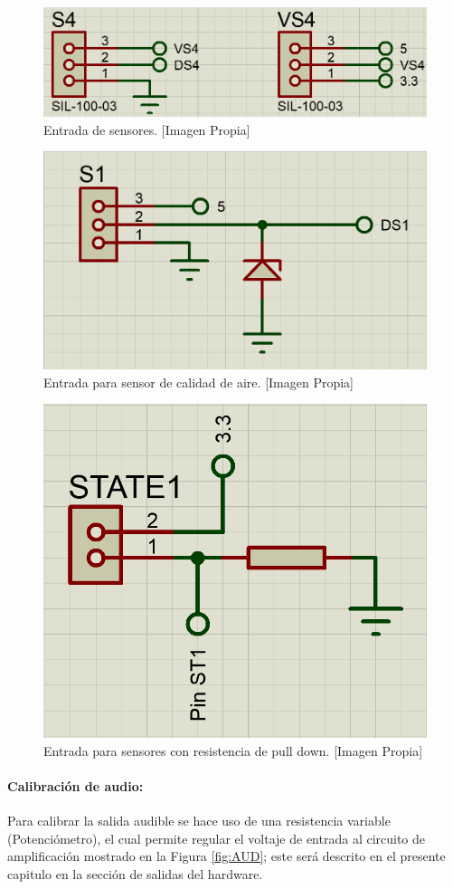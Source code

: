 		\begin{figure}[H]
			\centering
			\caption[Entrada de sensores.]{Entrada de sensores. [Imagen Propia]}
			\label{fig:SVS}
			\includegraphics[width=0.7\linewidth]{Imagenes/SVS}
		\end{figure}
	
		\begin{figure}[H]
			\centering
			\caption[Entrada para sensor de calidad de aire.]{Entrada para sensor de calidad de aire. [Imagen Propia]}
			\label{fig:S1Aire}
			\includegraphics[width=0.6\linewidth]{Imagenes/S1Aire}
		\end{figure}
	
		\begin{figure}[H]
			\centering
			\caption[Entrada para sensores con resistencia de pull down.]{Entrada para sensores con resistencia de pull down. [Imagen Propia]}
			\label{fig:ST}
			\includegraphics[width=0.5\linewidth]{Imagenes/ST}
		\end{figure}		
	
	
	
	\paragraph{Calibración de audio:}
		Para calibrar la salida audible se hace uso de una resistencia variable (Potenciómetro), el cual permite regular el voltaje de entrada al circuito de amplificación mostrado en la Figura \ref{fig:AUD}; este será descrito en el presente capitulo en la sección de salidas del hardware.
		
